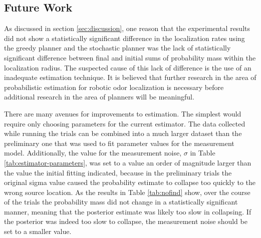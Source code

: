 \documentclass[submit, 12pt]{aiaa-pretty-modified}
\begin{document}


\subsection{Future Work}
As discussed in section \ref{sec:discussion}, one reason that the
experimental results did not show a statistically significant
difference in the localization rates using the
greedy planner and the stochastic planner was the lack of statistically significant
difference between final and initial sums of probability mass within
the localization radius.  The suspected cause of this lack of
difference is the use of an inadequate estimation technique.  It is
believed that further research in the area of probabilistic estimation for robotic
odor localization is necessary before additional research in the area
of planners will be meaningful.

There are many avenues for improvements to estimation. The simplest would
require only choosing parameters for the current estimator. The data collected
while running the trials can be combined into a much larger dataset than the
preliminary one that was used to fit parameter values for the measurement model.
Additionally, the value for the measurement noise, $\sigma$ in Table
\ref{tab:estimator-parameters}, was set to a value an order of magnitude larger
than the value the initial fitting indicated, because in the preliminary trials
the original sigma value caused the probability estimate to collapse too quickly
to the wrong source location. As the results in Table \ref{tab:nofind} show,
over the course of the trials the probability mass did not change in a
statistically significant manner, meaning that the posterior estimate was likely
too slow in collapsing.  If the posterior was indeed too slow to collapse, the
measurement noise should be set to a smaller value. 
\end{document}
